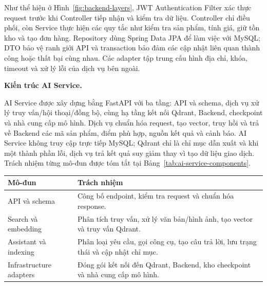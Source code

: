 Như thể hiện ở Hình~\ref{fig:backend-layers}, JWT Authentication Filter xác thực request trước khi Controller tiếp nhận và kiểm tra dữ liệu. Controller chỉ điều phối, còn Service thực hiện các quy tắc như kiểm tra sản phẩm, tính giá, giữ tồn kho và tạo đơn hàng. Repository dùng Spring Data JPA để làm việc với MySQL; DTO bảo vệ ranh giới API và transaction bảo đảm các cập nhật liên quan thành công hoặc thất bại cùng nhau. Các adapter tập trung cấu hình địa chỉ, khóa, timeout và xử lý lỗi của dịch vụ bên ngoài.

\textbf{Kiến trúc AI Service.}

AI Service được xây dựng bằng FastAPI với ba tầng: API và schema, dịch vụ xử lý truy vấn/hội thoại/đồng bộ, cùng hạ tầng kết nối Qdrant, Backend, checkpoint và nhà cung cấp mô hình. Dịch vụ chuẩn hóa request, tạo vector, truy hồi và trả về Backend các mã sản phẩm, điểm phù hợp, nguồn kết quả và cảnh báo. AI Service không truy cập trực tiếp MySQL; Qdrant chỉ là chỉ mục dẫn xuất và khi một thành phần lỗi, dịch vụ trả kết quả suy giảm thay vì tạo dữ liệu giao dịch. Trách nhiệm từng mô-đun được tóm tắt tại Bảng~\ref{tab:ai-service-components}.

\begin{breakabletable}
    \centering
    \caption{Trách nhiệm các mô-đun chính của AI Service}
    \label{tab:ai-service-components}
    \begin{tabularx}{\textwidth}{|p{}|X|}
        \hline
        \textbf{Mô-đun} & \textbf{Trách nhiệm} \\
        \hline
        API và schema & Công bố endpoint, kiểm tra request và chuẩn hóa response. \\
        \hline
        Search và embedding & Phân tích truy vấn, xử lý văn bản/hình ảnh, tạo vector và truy vấn Qdrant. \\
        \hline
        Assistant và indexing & Phân loại yêu cầu, gọi công cụ, tạo câu trả lời, lưu trạng thái và cập nhật chỉ mục. \\
        \hline
        Infrastructure adapters & Đóng gói kết nối đến Qdrant, Backend, kho checkpoint và nhà cung cấp mô hình. \\
        \hline
    \end{tabularx}
\end{breakabletable}


